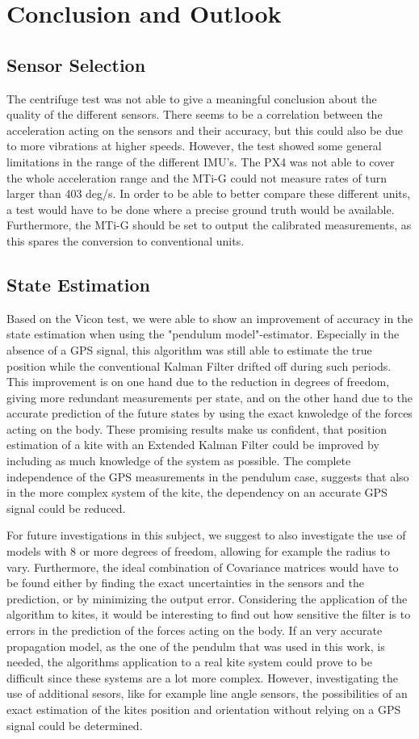 \chapter{Conclusion and Outlook}\label{cha}
\section{Sensor Selection}
The centrifuge test was not able to give a meaningful conclusion about the quality of the different sensors. There seems to be a correlation between the acceleration acting on the sensors and their accuracy, but this could also be due to more vibrations at higher speeds. However, the test showed some general limitations in the range of the different IMU's. The PX4 was not able to cover the whole acceleration range and the MTi-G could not measure rates of turn larger than 403 deg/s. In order to be able to better compare these different units, a test would have to be done where a precise ground truth would be available. Furthermore, the MTi-G should be set to output the calibrated measurements, as this spares the conversion to conventional units.

\section{State Estimation}
Based on the Vicon test, we were able to show an improvement of accuracy in the state estimation when using the "pendulum model"-estimator. Especially in the absence of a GPS signal, this algorithm was still able to estimate the true position while the conventional Kalman Filter drifted off during such periods. This improvement is on one hand due to the reduction in degrees of freedom, giving more redundant measurements per state, and on the other hand due to the accurate prediction of the future states by using the exact knwoledge of the forces acting on the body. These promising results make us confident, that position estimation of a kite with an Extended Kalman Filter could be improved by including as much knowledge of the system as possible. The complete independence of the GPS measurements in the pendulum case, suggests that also in the more complex system of the kite, the dependency on an accurate GPS signal could be reduced.

For future investigations in this subject, we suggest to also investigate the use of models with 8 or more degrees of freedom, allowing for example the radius to vary. Furthermore, the ideal combination of Covariance matrices would have to be found either by finding the exact uncertainties in the sensors and the prediction, or by minimizing the output error. Considering the application of the algorithm to kites, it would be interesting to find out how sensitive the filter is to errors in the prediction of the forces acting on the body. If an very accurate propagation model, as the one of the pendulm that was used in this work, is needed, the algorithms application to a real kite system could prove to be difficult since these systems are a lot more complex. However, investigating the use of additional sesors, like for example line angle sensors, the possibilities of an exact estimation of the kites position and orientation without relying on a GPS signal could be determined. 

